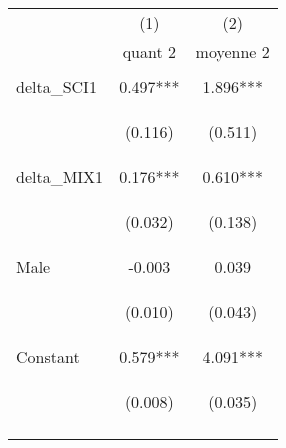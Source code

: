 \documentclass{article} %
\begin{document}
\begin{table}[H]


\begin{center}
\begin{tabular}{lcc} \hline
 & (1) & (2) \\
 & quant 2 & moyenne 2 \\ \hline
\vspace{4pt} & \begin{footnotesize}\end{footnotesize} & \begin{footnotesize}\end{footnotesize} \\
delta\_SCI1 & 0.497*** & 1.896*** \\
\vspace{4pt} & \begin{footnotesize}(0.116)\end{footnotesize} & \begin{footnotesize}(0.511)\end{footnotesize} \\
delta\_MIX1 & 0.176*** & 0.610*** \\
\vspace{4pt} & \begin{footnotesize}(0.032)\end{footnotesize} & \begin{footnotesize}(0.138)\end{footnotesize} \\
Male & -0.003 & 0.039 \\
\vspace{4pt} & \begin{footnotesize}(0.010)\end{footnotesize} & \begin{footnotesize}(0.043)\end{footnotesize} \\
Constant & 0.579*** & 4.091*** \\
 & \begin{footnotesize}(0.008)\end{footnotesize} & \begin{footnotesize}(0.035)\end{footnotesize} \\
\vspace{4pt} & \begin{footnotesize}\end{footnotesize} & \begin{footnotesize}\end{footnotesize} \\

\end{tabular}
\end{center}
\end{table}
\end{document}
